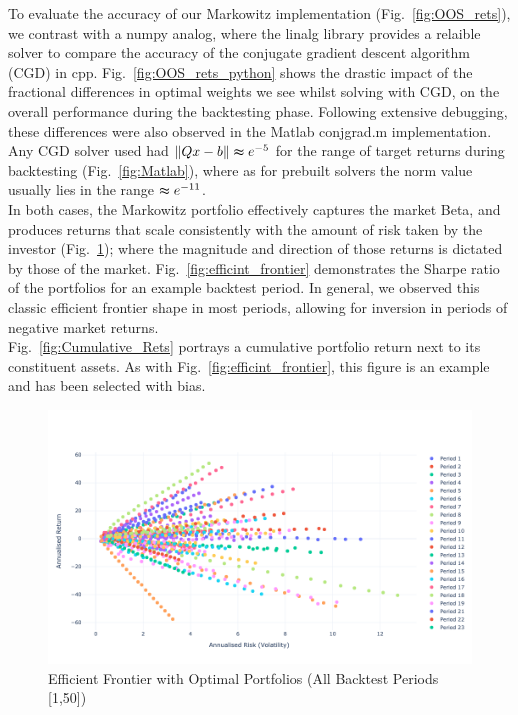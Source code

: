 \documentclass[12pt,twoside]{article}
\begin{document}
To evaluate the accuracy of our Markowitz implementation (Fig.~\ref{fig:OOS_rets}), we contrast with a numpy analog, where the linalg library provides a relaible solver to compare the accuracy of the conjugate gradient descent algorithm (CGD) in cpp. Fig.~\ref{fig:OOS_rets_python} shows the drastic impact of the fractional differences in optimal weights we see whilst solving with CGD, on the overall performance during the backtesting phase. Following extensive debugging, these differences were also observed in the Matlab conjgrad.m implementation. Any CGD solver used had $\lVert Qx - b \rVert \thickapprox e^{-5}$ for the range of target returns during backtesting (Fig.~\ref{fig:Matlab}), where as for prebuilt solvers the norm value usually lies in the range $\thickapprox e^{-11}$. \\

In both cases, the Markowitz portfolio effectively captures the market Beta, and produces returns that scale consistently with the amount of risk taken by the investor (Fig.~\ref{fig:eff_front_all}); where the magnitude and direction of those returns is dictated by those of the market. Fig.~\ref{fig:efficint_frontier} demonstrates the Sharpe ratio of the portfolios for an example backtest period. In general, we observed this classic efficient frontier shape in most periods, allowing for inversion in periods of negative market returns. 
\\

Fig.~\ref{fig:Cumulative_Rets} portrays a cumulative portfolio return next to its constituent assets. As with Fig.~\ref{fig:efficint_frontier}, this figure is an example and has been selected with bias.

\begin{figure}[]
    \centering
    \includegraphics[width = 1.0\hsize]{./figures/efficient_frontier_all_periods.png}
    \caption{Efficient Frontier with Optimal Portfolios (All Backtest Periods [1,50])}
    \label{fig:eff_front_all}
\end{figure}
\end{document}
